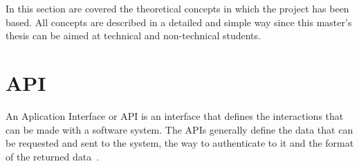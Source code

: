 

\nonzeroparskip In this section are covered the theoretical concepts in which the project has been based. All concepts are described in a detailed and simple way since this master's thesis can be aimed at technical and non-technical students.

\section{API}

\nonzeroparskip An Aplication Interface or API is an interface that defines the interactions that can be made with a software system. The APIs generally define the data that can be requested and sent to the system, the way to authenticate to it and the format of the returned data~\cite{ibm_restapi}.


